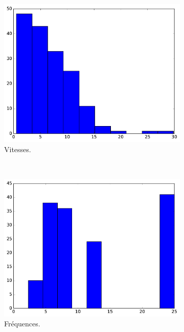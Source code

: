 	\begin{figure}[!htbp]
		\begin{subfigure}[t]{\subImgWclicks}
			\centering
			\includegraphics[width=\textwidth]{figures/ch3/concordeA_filteredSpeed}
			\caption{Vitesses.}
			\label{fig:concordeA_filteredSpeed}
		\end{subfigure}
		~
		\begin{subfigure}[t]{\subImgWclicks}
			\centering
			\includegraphics[width=\textwidth]{figures/ch3/concordeA_frequency}
			\caption{Fréquences.}
			\label{fig:concordeA_frequency}
		\end{subfigure}
		~
		\begin{subfigure}[t]{\subImgWclicks}

\end{subfigure}
\end{figure}
